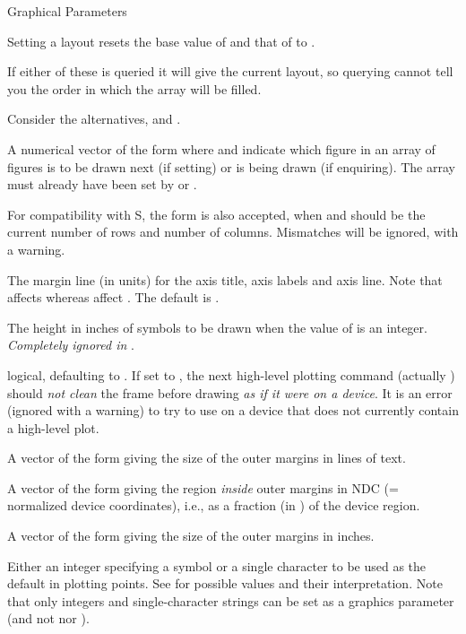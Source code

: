 \begin{Section}{Graphical Parameters}
\begin{description}
Setting a layout resets the base value of  and that of
 to .

If either of these is queried it will give the current layout, so
querying cannot tell you the order in which the array will be filled.

Consider the alternatives,  and
.

\item[\code{mfg}] A numerical vector of the form 
where  and  indicate which figure in an array of
figures is to be drawn next (if setting) or is being drawn (if
enquiring).  The array must already have been set by 
or .

For compatibility with S, the form  is also
accepted, when  and  should be the current
number of rows and number of columns.  Mismatches will be ignored,
with a warning.
\item[\code{mgp}] The margin line (in  units) for the axis
title, axis labels and axis line.  Note that  affects
 whereas  affect .
The default is .
\item[\code{mkh}] The height in inches of symbols to be drawn when
the value of  is an integer. \emph{Completely ignored in \R{}}.

\item[\code{new}] logical, defaulting to .  If set to
, the next high-level plotting command (actually
) should \emph{not clean} the frame before
drawing \emph{as if it were on a  device}.  It is
an error (ignored with a warning) to try to use 
on a device that does not currently contain a high-level plot.
\item[\code{oma}] A vector of the form  giving the size of the outer margins in lines of text.\\{}


\item[\code{omd}] A vector of the form 
giving the region \emph{inside} outer margins in NDC (=
normalized device coordinates), i.e., as a fraction (in \eqn{[0, 1]}{})
of the device region.
\item[\code{omi}] A vector of the form  giving the size of the outer margins in inches.
\item[\code{pch}] Either an integer specifying a symbol or a single
character to be used as the default in plotting points.  See
 for possible values and their interpretation.
Note that only integers and single-character strings can
be set as a graphics parameter (and not  nor ).


\end{description}
\end{Section}
